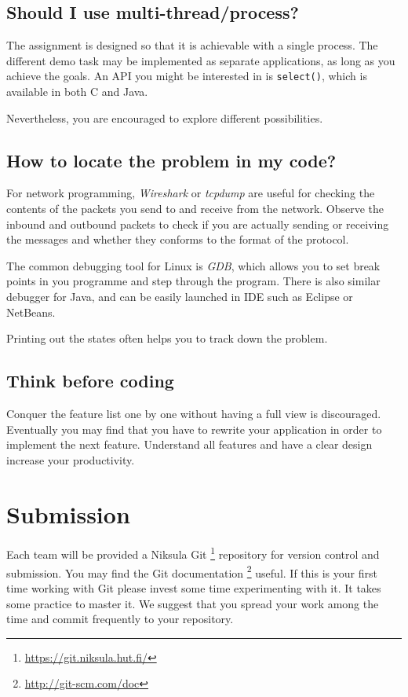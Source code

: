 \documentclass[12pt, a4paper]{article}
\begin{document}
\subsection*{Should I use multi-thread/process?}
The assignment is designed so that it is achievable with a single process.
The different demo task may be implemented as separate applications, as long as you achieve the goals.
An API you might be interested in is \texttt{select()}, which is available in both C and Java.

Nevertheless, you are encouraged to explore different possibilities.

\subsection*{How to locate the problem in my code?}
For network programming, \emph{Wireshark} or \emph{tcpdump} are useful for checking the contents of the packets you send to and receive from the network.
Observe the inbound and outbound packets to check if you are actually sending or receiving the messages and whether they conforms to the format of the protocol.

The common debugging tool for Linux is \emph{GDB}, which allows you to set break points in you programme and step through the program.
There is also similar debugger for Java, and can be easily launched in IDE such as Eclipse or NetBeans.

Printing out the states often helps you to track down the problem.

\subsection*{Think before coding}
Conquer the feature list one by one without having a full view is discouraged.
Eventually you may find that you have to rewrite your application in order to implement the next feature.
Understand all features and have a clear design increase your productivity.


\section{Submission}
Each team will be provided a Niksula Git \footnote{\url{https://git.niksula.hut.fi/}} repository for version control and submission.
You may find the Git documentation \footnote{\url{http://git-scm.com/doc}} useful.
If this is your first time working with Git please invest some time experimenting with it.
It takes some practice to master it.
We suggest that you spread your work among the time and commit frequently to your repository.
\end{document}

